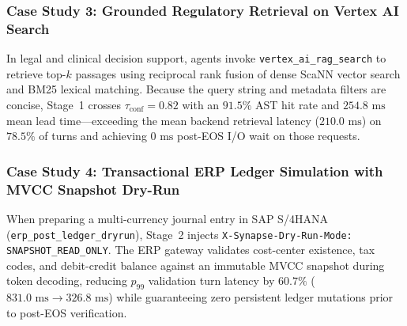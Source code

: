 \documentclass[10pt,conference]{IEEEtran}
\begin{document}
\subsubsection{Case Study 3: Grounded Regulatory Retrieval on Vertex AI Search}
In legal and clinical decision support, agents invoke \texttt{vertex\_ai\_rag\_search} to retrieve top-$k$ passages using reciprocal rank fusion of dense ScaNN vector search and BM25 lexical matching. Because the query string and metadata filters are concise, Stage~1 crosses $\tau_{\text{conf}} = 0.82$ with an $91.5\%$ AST hit rate and $254.8\text{ ms}$ mean lead time---exceeding the mean backend retrieval latency ($210.0\text{ ms}$) on $78.5\%$ of turns and achieving $0\text{ ms}$ post-EOS I/O wait on those requests.

\subsubsection{Case Study 4: Transactional ERP Ledger Simulation with MVCC Snapshot Dry-Run}
When preparing a multi-currency journal entry in SAP S/4HANA (\texttt{erp\_post\_ledger\_dryrun}), Stage~2 injects \texttt{X-Synapse-Dry-Run-Mode: SNAPSHOT\_READ\_ONLY}. The ERP gateway validates cost-center existence, tax codes, and debit-credit balance against an immutable MVCC snapshot during token decoding, reducing $p_{99}$ validation turn latency by $60.7\%$ ($831.0\text{ ms} \to 326.8\text{ ms}$) while guaranteeing zero persistent ledger mutations prior to post-EOS verification.
\end{document}
